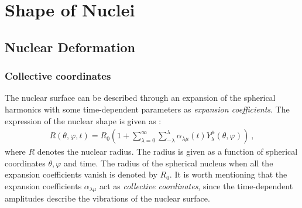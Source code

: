 \chapter{Shape of Nuclei}
\label{chapter-2}

\section{Nuclear Deformation}

\subsection{Collective coordinates}

The nuclear surface can be described through an expansion of the spherical harmonics with some time-dependent parameters as \emph{expansion coefficients}. The expression of the nuclear shape is given as \cite{greiner1996nuclear}:
\begin{align}
    R(\theta,\varphi,t)=R_0\left(1+\sum_{\lambda=0}^\infty\sum_{-\lambda}^\lambda\alpha_{\lambda\mu}(t)Y_\lambda^\mu(\theta,\varphi)\right)\ ,
    \label{nuclear-shape}
\end{align}
where $R$ denotes the nuclear radius. The radius is given as a function of spherical coordinates $\theta,\varphi$ and time. The radius of the spherical nucleus when all the expansion coefficients vanish is denoted by $R_0$. It is worth mentioning that the expansion coefficients $\alpha_{\lambda\mu}$ act as \emph{collective coordinates}, since the time-dependent amplitudes describe the vibrations of the nuclear surface.




